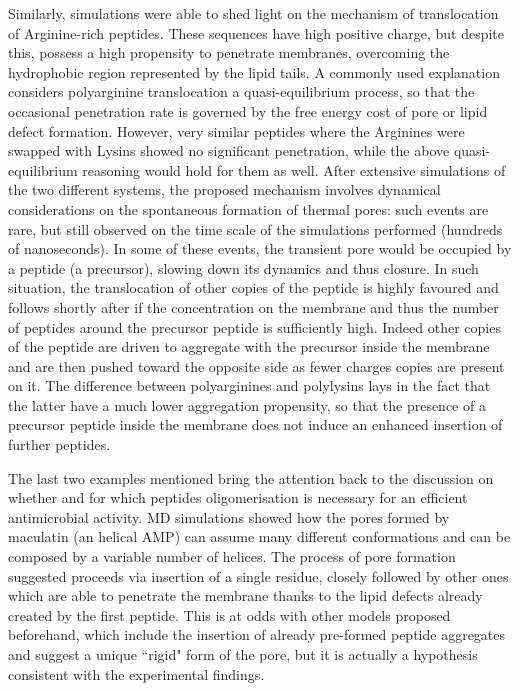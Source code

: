 Similarly, simulations were able to shed light on the mechanism of translocation of Arginine-rich peptides. These sequences have high positive charge, but despite this, possess a high propensity to penetrate membranes, overcoming the hydrophobic region represented by the lipid tails.
%
A commonly used explanation considers polyarginine translocation a quasi-equilibrium process, so that the occasional penetration rate is governed by the free energy cost of pore or lipid defect formation.
%
However, very similar peptides where the Arginines were swapped with Lysins showed no significant penetration, while the above quasi-equilibrium reasoning would hold for them as well.
%
After extensive simulations of the two different systems, the proposed mechanism involves dynamical considerations on the spontaneous formation of thermal pores: such events are rare, but still observed on the time scale of the simulations performed (hundreds of nanoseconds).
%
In some of these events, the transient pore would be occupied by a peptide (a precursor), slowing down its dynamics and thus closure. In such situation, the translocation of other copies of the peptide is highly favoured and follows shortly after if the concentration on the membrane and thus the number of peptides around the precursor peptide is sufficiently high. Indeed other copies of the peptide are driven to aggregate with the precursor inside the membrane and are then pushed toward the opposite side as fewer charges copies are present on it.
%
The difference between polyarginines and polylysins lays in the fact that the latter have a much lower aggregation propensity, so that the presence of a precursor peptide inside the membrane does not induce an enhanced insertion of further peptides.

The last two examples mentioned bring the attention back to the discussion on whether and for which peptides oligomerisation is necessary for an efficient antimicrobial activity.
%
MD simulations showed how the pores formed by maculatin (an helical AMP) can assume many different conformations and can be composed by a variable number of helices. The process of pore formation suggested proceeds via insertion of a single residue, closely followed by other ones which are able to penetrate the membrane thanks to the lipid defects already created by the first peptide. This is at odds with other models proposed beforehand, which include the insertion of already pre-formed peptide aggregates and suggest a unique ``rigid" form of the pore, but it is actually a hypothesis consistent with the experimental findings.

